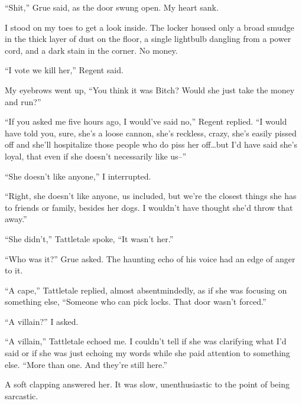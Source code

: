 ``Shit,'' Grue said, as the door swung open.  My heart sank.



I stood on my toes to get a look inside.  The locker housed only a broad smudge in the thick layer of dust on the floor, a single lightbulb dangling from a power cord, and a dark stain in the corner.  No money.



``I vote we kill her,'' Regent said.



My eyebrows went up, ``You think it was Bitch?  Would she just take the money and run?''



``If you asked me five hours ago, I would've said no,'' Regent replied.  ``I would have told you, sure, she's a loose cannon, she's reckless, crazy, she's easily pissed off and she'll hospitalize those people who do piss her off\ldots but I'd have said she's loyal, that even if she doesn't necessarily like us--''



``She doesn't like anyone,'' I interrupted.



``Right, she doesn't like anyone, us included, but we're the closest things she has to friends or family, besides her dogs.  I wouldn't have thought she'd throw that away.''



``She didn't,'' Tattletale spoke, ``It wasn't her.''



``Who was it?'' Grue asked.  The haunting echo of his voice had an edge of anger to it.



``A cape,'' Tattletale replied, almost absentmindedly, as if she was focusing on something else, ``Someone who can pick locks.  That door wasn't forced.''



``A villain?'' I asked.



``A villain,'' Tattletale echoed me.  I couldn't tell if she was clarifying what I'd said or if she was just echoing my words while she paid attention to something else.  ``More than one.  And they're still here.''



A soft clapping answered her.  It was slow, unenthusiastic to the point of being sarcastic.



